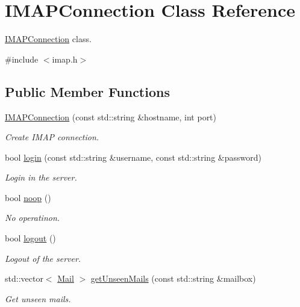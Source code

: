 \hypertarget{classIMAPConnection}{}\section{I\+M\+A\+P\+Connection Class Reference}
\label{classIMAPConnection}


\hyperlink{classIMAPConnection}{I\+M\+A\+P\+Connection} class.  




{\ttfamily \#include $<$imap.\+h$>$}

\subsection*{Public Member Functions}
\begin{DoxyCompactItemize}
\item 
\hyperlink{classIMAPConnection_ad5bc450af38cf05e3c1747a3557939f8}{I\+M\+A\+P\+Connection} (const std\+::string \&hostname, int port)
\begin{DoxyCompactList}\small\item\em Create I\+M\+AP connection. \end{DoxyCompactList}\item 
bool \hyperlink{classIMAPConnection_a13d2dba8599abbbf52bc6e1eb4b7db82}{login} (const std\+::string \&username, const std\+::string \&password)
\begin{DoxyCompactList}\small\item\em Login in the server. \end{DoxyCompactList}\item 
bool \hyperlink{classIMAPConnection_a64921072bad6e5ae342c54ee9945e3ad}{noop} ()
\begin{DoxyCompactList}\small\item\em No operatinon. \end{DoxyCompactList}\item 
bool \hyperlink{classIMAPConnection_a250af5ae627fcdc73f3322237fe537f4}{logout} ()
\begin{DoxyCompactList}\small\item\em Logout of the server. \end{DoxyCompactList}\item 
std\+::vector$<$ \hyperlink{structMail}{Mail} $>$ \hyperlink{classIMAPConnection_ac4fdf095774add4ec038c2738074c4b8}{get\+Unseen\+Mails} (const std\+::string \&mailbox)
\begin{DoxyCompactList}\small\item\em Get unseen mails. \end{DoxyCompactList}\item 

\end{DoxyCompactItemize}
